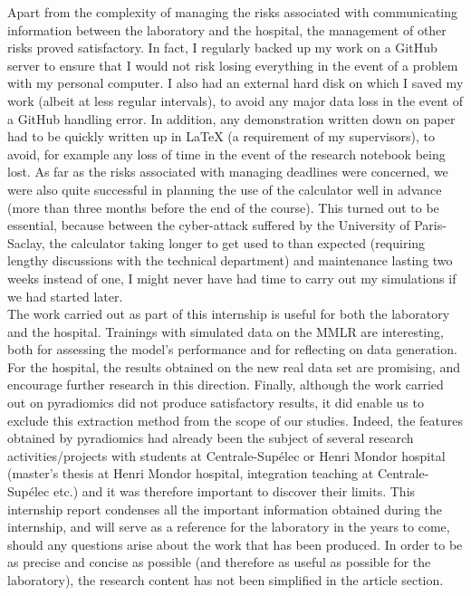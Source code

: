 \documentclass[preprint,12pt]{elsarticle}
\begin{document}
\indent Apart from the complexity of managing the risks associated with communicating information between the laboratory and the hospital, the management of other risks proved satisfactory. In fact, I regularly backed up my work on a GitHub server to ensure that I would not risk losing everything in the event of a problem with my personal computer. I also had an external hard disk on which I saved my work (albeit at less regular intervals), to avoid any major data loss in the event of a GitHub handling error. In addition, any demonstration written down on paper had to be quickly written up in LaTeX (a requirement of my supervisors), to avoid, for example any loss of time in the event of the research notebook being lost. As far as the risks associated with managing deadlines were concerned, we were also quite successful in planning the use of the calculator well in advance (more than three months before the end of the course). This turned out to be essential, because between the cyber-attack suffered by the University of Paris-Saclay, the calculator taking longer to get used to than expected (requiring lengthy discussions with the technical department) and maintenance lasting two weeks instead of one, I might never have had time to carry out my simulations if we had started later.\\
\indent The work carried out as part of this internship is useful for both the laboratory and the hospital. Trainings with simulated data on the MMLR are interesting, both for assessing the model's performance and for reflecting on data generation. For the hospital, the results obtained on the new real data set are promising, and encourage further research in this direction. Finally, although the work carried out on pyradiomics did not produce satisfactory results, it did enable us to exclude this extraction method from the scope of our studies. Indeed, the features obtained by pyradiomics had already been the subject of several research activities/projects with students at Centrale-Supélec or Henri Mondor hospital (master's thesis at Henri Mondor hospital, integration teaching at Centrale-Supélec etc.) and it was therefore important to discover their limits. This internship report condenses all the important information obtained during the internship, and will serve as a reference for the laboratory in the years to come, should any questions arise about the work that has been produced. In order to be as precise and concise as possible (and therefore as useful as possible for the laboratory), the research content has not been simplified in the article section.\\
\end{document}
